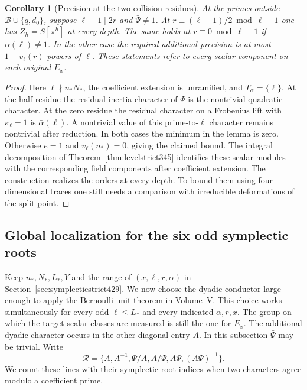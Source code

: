 \documentclass[a4paper,11pt]{article}
\newtheorem{corollary}[proposition]{Corollary}
\theoremstyle{definition}
\theoremstyle{remark}
\numberwithin{equation}{section}
\begin{document}
\begin{corollary}[Precision at the two collision residues]\leavevmode
\label{cor:collisionprecision429}
At the primes outside \(\mathcal B\cup\{q,d_0\}\), suppose
\(\ell-1\mid2r\) and \(\bar\Psi\ne1\). At
\(r\equiv(\ell-1)/2\bmod\ell-1\) one has
\(Z_h=S[\pi^h]\) at every depth. The same holds at
\(r\equiv0\bmod\ell-1\) if \(\alpha(\ell)\ne1\).
In the other case the required additional precision is
at most \(1+v_\ell(r)\) powers of \(\ell\). These statements
refer to every scalar component on each original \(E_x\).
\end{corollary}
\begin{proof}
Here \(\ell\nmid n_*N_*\), the coefficient extension is
unramified, and \(T_\alpha=\{\ell\}\). At the half residue
the residual inertia character of \(\Psi\) is the nontrivial
quadratic character. At the zero residue the residual
character on a Frobenius lift with \(\kappa_\ell=1\) is
\(\bar\alpha(\ell)\). A nontrivial value of this prime-to-\(\ell\)
character remains nontrivial after reduction. In both cases
the minimum in the lemma is zero. Otherwise \(e=1\) and
\(v_\ell(n_*)=0\), giving the claimed bound. The integral
decomposition of Theorem~\ref{thm:levelstrict345} identifies
these scalar modules with the corresponding field components
after coefficient extension. The construction realizes the
orders at every depth. To bound them using four-dimensional
traces one still needs a comparison with irreducible
deformations of the split point.
\end{proof}


\subsection{Global localization for the six odd symplectic roots}
\label{sec:oddrootsalllevels430}

Keep \(n_*,N_*,L_*,Y\) and the range of \((x,\ell,r,\alpha)\)
in Section~\ref{sec:symplecticstrict429}. We now choose the dyadic
conductor large enough to apply the Bernoulli unit theorem in
Volume~V. This choice works simultaneously for every odd
\(\ell\le L_*\) and every indicated \(\alpha,r,x\). The group on
which the target scalar classes are measured is still the one for
\(E_x\). The additional dyadic character occurs in the other
diagonal entry \(A\). In this subsection \(\bar\Psi\) may be
trivial. Write
\[
 \mathcal R=\{A,A^{-1},\Psi/A,A/\Psi,A\Psi,(A\Psi)^{-1}\}.
\]
We count these lines with their symplectic root indices when two
characters agree modulo a coefficient prime.
\end{document}
